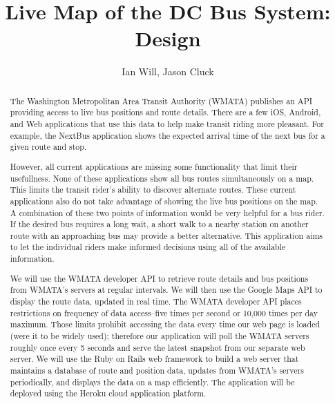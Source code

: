 \documentclass[12pt]{article}
\title{Live Map of the DC Bus System: Design}
\author{Ian Will, Jason Cluck}
\date{}
\begin{document}
\maketitle

\begin{abstract}
The Washington Metropolitan Area Transit Authority (WMATA) publishes an API providing access to live bus positions and route details.  There are a few iOS, Android, and Web applications that use this data to help make transit riding more pleasant.  For example, the NextBus application shows the expected arrival time of the next bus for a given route and stop.

However, all current applications are missing some functionality that limit their usefullness.  None of these applications show all bus routes simultaneously on a map.  This limits the transit rider's ability to discover alternate routes.  These current applications also do not take advantage of showing the live bus positions on the map.  A combination of these two points of information would be very helpful for a bus rider.  If the desired bus requires a long wait, a short walk to a nearby station on another route with an approaching bus may provide a better alternative.  This application aims to let the individual riders make informed decisions using all of the available information.

We will use the WMATA developer API to retrieve route details and bus positions from WMATA's servers at regular intervals.  We will then use the Google Maps API to display the route data, updated in real time.  The WMATA developer API places restrictions on frequency of data access--five times per second or 10,000 times per day maximum.  Those limits prohibit accessing the data every time our web page is loaded (were it to be widely used); therefore our application will poll the WMATA servers roughly once every 5 seconds and serve the latest snapshot from our separate web server.  We will use the Ruby on Rails web framework to build a web server that maintains a database of route and position data, updates from WMATA's servers periodically, and displays the data on a map efficiently.  The application will be deployed using the Heroku cloud application platform.
\end{abstract}
\end{document}

